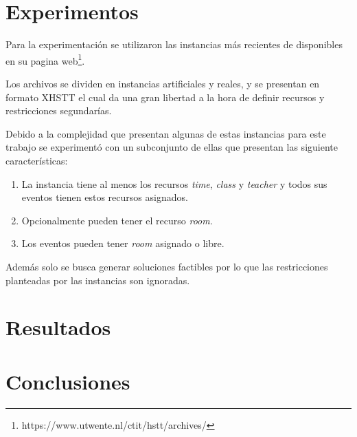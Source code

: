\documentclass[letter, 10pt]{article}
\begin{document}
\section{Experimentos}\label{sec:exp}
Para la experimentación se utilizaron las instancias más recientes de 
\cite{post2016third} disponibles en su pagina 
web\footnote{https://www.utwente.nl/ctit/hstt/archives/}.

Los archivos se dividen en instancias artificiales y reales, y se presentan en
formato XHSTT\cite{post2014xhstt} el cual da una gran libertad a la hora de
definir recursos y restricciones segundarías.

Debido a la complejidad que presentan algunas de estas instancias para este
trabajo se experimentó con un subconjunto de ellas que presentan las siguiente
características:
\begin{enumerate}
  \item
    La instancia tiene al menos los recursos \emph{time}, \emph{class} y
    \emph{teacher} y todos sus eventos tienen estos recursos asignados.
  \item
    Opcionalmente pueden tener el recurso \emph{room}.
  \item
    Los eventos pueden tener \emph{room} asignado o libre.
\end{enumerate}

Además solo se busca generar soluciones factibles por lo que las restricciones
planteadas por las instancias son ignoradas.

\section{Resultados}\label{sec:res}

\section{Conclusiones}\label{sec:conc}



\end{document}
